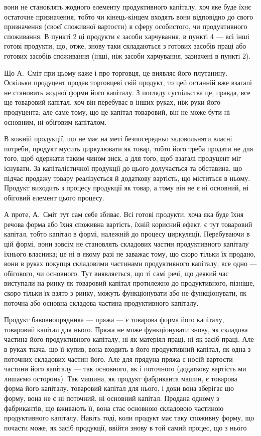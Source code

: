 \parcont{}  %
вони не становлять жодного елементу продуктивного капіталу, хоч яке
буде їхнє остаточне призначення, тобто чи кінець-кінцем входять вони
відповідно до свого призначення (своєї споживної вартости) в сферу особистого,
чи продуктивного споживання. В пункті 2 ці продукти є засоби
харчування, в пункті 4 — всі інші готові продукти, що, отже, знову таки
складаються з готових засобів праці або готових засобів споживання
(інші, ніж засоби харчування, зазначені в пункті 2).

Що А.~Сміт при цьому каже і про торговця, це виявляє його плутанину.
Оскільки продуцент продав торговцеві свій продукт, то цей останній
вже взагалі не становить жодної форми його капіталу. З погляду
суспільства це, правда, все ще товаровий капітал, хоч він перебуває в
інших руках, ніж руки його продуцента; але саме тому, що це капітал
товаровий, він не може бути ні основним, ні обіговим капіталом.

В кожній продукції, що не має на меті безпосередньо задовольняти
власні потреби, продукт мусить циркулювати як товар, тобто його
треба продати не для того, щоб одержати таким чином зиск, а для того,
щоб взагалі продуцент міг існувати. За капіталістичної продукції до
цього долучається та обставина, що підчас продажу товару реалізується
й додаткову вартість, що міститься в ньому. Продукт виходить з процесу
продукції як товар, а тому він не є ні основний, ні обіговий елемент
цього процесу.

А проте, А.~Сміт тут сам себе збиває. Всі готові продукти, хоча
яка буде їхня речова форма або їхня споживна вартість, їхній корисний
ефект, є тут товаровий капітал, тобто капітал в формі, належній до процесу
циркуляції. Перебуваючи в цій формі, вони зовсім не становлять
складових частин продуктивного капіталу їхнього власника; це ні в якому
разі не заважає тому, що скоро тільки їх продано, вони  в
руках покупця складовими частинами продуктивного капіталу, все одно —
обігового, чи основного. Тут виявляється, що ті самі речі, що деякий
час виступали на ринку як товаровий капітал протилежно до продуктивного,
пізніше, скоро тільки їх взято з ринку, можуть функціонувати або
не функціонувати, як поточна або основна складова частина продуктивного
капіталу.

Продукт бавовнопрядника — пряжа — є товарова форма його капіталу,
товаровий капітал для нього. Пряжа не може функціонувати знову, як
складова частина його продуктивного капіталу, ні як матеріял праці, ні
як засіб праці. Але в руках ткача, що її купив, вона входить в його
продуктивний капітал, як одна з поточних складових частин його. Але
для прядуна пряжа є носій вартости частини його капіталу — так основного,
як і поточного (додаткову вартість ми лишаємо осторонь). Так
машина, як продукт фабриканта машин, є товарова форма його капіталу,
товаровий капітал для нього, і доки вона зберігає цю форму, вона не є
ні поточний, ні основний капітал. Продана одному з фабрикантів, що
вживають її, вона стає основною складовою частиною продуктивного капіталу.
Навіть тоді, коли продукт має таку споживну форму, що почасти
може, як засіб продукції, ввійти знову в той самий процес, що з нього
\parbreak{}  %
